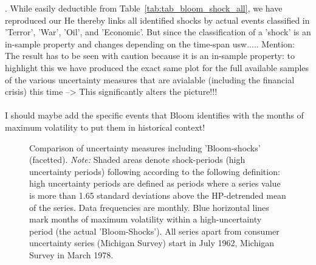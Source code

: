 \documentclass[a4paper,11pt,listof=nochaptergap,oneside,pointednumbers,bibtotoc,bigheadings,liststotoc]{scrbook}
\begin{document}
. While easily deductible from Table~\ref{tab:tab_bloom_shock_all}, we have reproduced our 
He thereby links all identified shocks by actual events classified in 'Terror', 'War', 'Oil', and 'Economic'. But since the classification of a 'shock' is an in-sample property and changes depending on the time-span usw.....
Mention: The result has to be seen with caution because it is an in-sample property: to highlight this we have produced the exact same plot for the full available samples of the various uncertainty measures that are avialable (including the financial crisis) this time --> This significantly alters the picture!!!\\
\\
I should maybe add the specific events that Bloom identifies with the months of maximum volatility to put them in historical context!

\begin{landscape}
\begin{figure}[!ht]
   \centering
   \setlength\fboxsep{0pt}
   \setlength\fboxrule{0pt}
      \caption[Comparison of uncertainty measures including 'Bloom-shocks' (facetted).]{Comparison of uncertainty measures including 'Bloom-shocks' (facetted).
      \textit{Note:} Shaded areas denote shock-periods (high uncertainty periods) following \citet{bloom:09} according to the following definition: high uncertainty periods are defined as periods where a series value is more than 1.65 standard deviations above the HP-detrended mean of the series. Data frequencies are monthly. Blue horizontal lines mark months of maximum volatility within a high-uncertainty period (the actual 'Bloom-Shocks'). All series apart from consumer uncertainty series (Michigan Survey) start in July 1962, Michigan Survey in March 1978.}   \label{fig:bloom_shock_all}
\end{figure}
\end{landscape}
\end{document}
